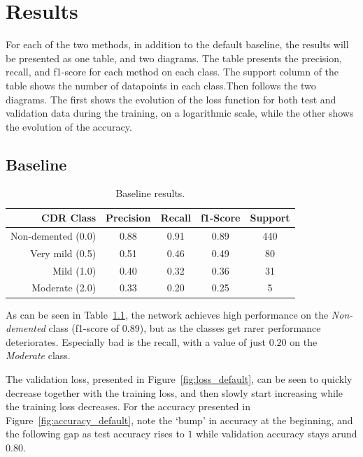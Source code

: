 \documentclass{kththesis}
\begin{document}
\chapter{Results}

For each of the two methods, in addition to the default baseline, the results will be presented as one table, and two diagrams. The table presents the precision, recall, and f1-score for each method on each class. The support column of the table shows the number of datapoints in each class.Then follows the two diagrams. The first shows the evolution of the loss function for both test and validation data during the training, on a logarithmic scale, while the other shows the evolution of the accuracy.

\section{Baseline}
\begin{table}[H]
  \begin{center}
    \caption{Baseline results. \label{tab:results_default}}
    \begin{tabular}{r|ccc|c}
      \textbf{CDR Class} & \textbf{Precision} & \textbf{Recall} & \textbf{f1-Score} & \textbf{Support} \\
      \toprule
      Non-demented (0.0) & 0.88 & 0.91 & 0.89 & 440 \\
      Very mild (0.5) & 0.51 & 0.46 & 0.49 & 80  \\
      Mild (1.0)         & 0.40 & 0.32 & 0.36 & 31  \\
      Moderate (2.0)     & 0.33 & 0.20 & 0.25 & 5   \\
    \end{tabular}
  \end{center}
\end{table}

As can be seen in Table~\ref{tab:results_default}, the network achieves high performance on the \textit{Non-demented} class (f1-score of 0.89), but as the classes get rarer performance deteriorates. Especially bad is the recall, with a value of just $0.20$ on the \textit{Moderate} class.

The validation loss, presented in Figure~\ref{fig:loss_default}, can be seen to quickly decrease together with the training loss, and then slowly start increasing while the training loss decreases. For the accuracy presented in Figure~\ref{fig:accuracy_default}, note the `bump' in accuracy at the beginning, and the following gap as test accuracy rises to $1$ while validation accuracy stays arund $0.80$.
\end{document}
